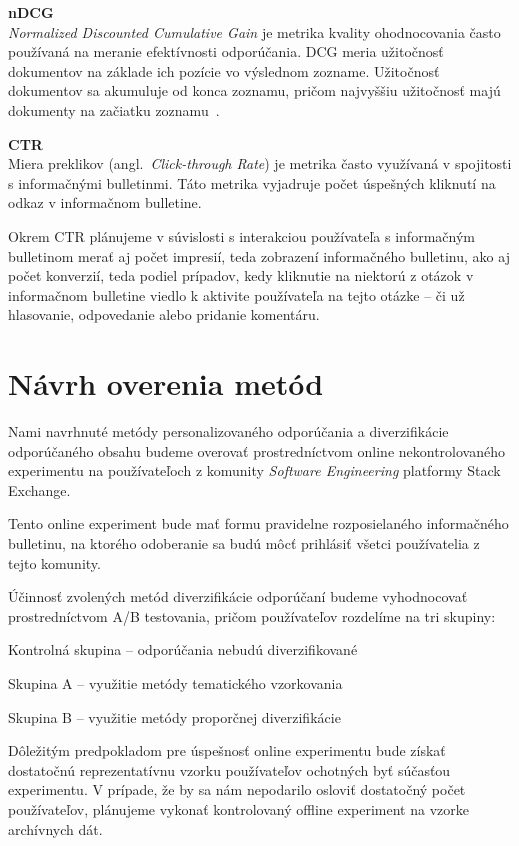 \textbf{nDCG}\\
\textit{Normalized Discounted Cumulative Gain} je metrika kvality ohodnocovania často používaná na meranie efektívnosti
odporúčania. DCG meria užitočnosť dokumentov na základe ich pozície vo výslednom zozname. Užitočnosť dokumentov sa akumuluje
od konca zoznamu, pričom najvyššiu užitočnosť majú dokumenty na začiatku zoznamu~\cite{Jrvelin2002}.

\textbf{CTR}\\
Miera preklikov (angl.~\emph{Click-through Rate}) je metrika často využívaná v spojitosti s informačnými bulletinmi.
Táto metrika vyjadruje počet úspešných kliknutí na odkaz v informačnom bulletine.

Okrem CTR plánujeme v súvislosti s interakciou používateľa s informačným bulletinom merať aj počet impresií,
teda zobrazení informačného bulletinu, ako aj počet konverzií, teda podiel prípadov, kedy kliknutie na niektorú z otázok
v informačnom bulletine viedlo k aktivite používateľa na tejto otázke -- či už hlasovanie, odpovedanie alebo pridanie komentáru.


\section{Návrh overenia metód}

Nami navrhnuté metódy personalizovaného odporúčania a diverzifikácie odporúčaného obsahu budeme overovať prostredníctvom
online nekontrolovaného experimentu na používateľoch z komunity \textit{Software Engineering} platformy Stack Exchange.

Tento online experiment bude mať formu pravidelne rozposielaného informačného bulletinu, na ktorého odoberanie sa budú
môcť prihlásiť všetci používatelia z tejto komunity.

Účinnosť zvolených metód diverzifikácie odporúčaní budeme vyhodnocovať prostredníctvom A/B testovania, pričom používateľov
rozdelíme na tri skupiny:
\begin{my_enumerate}
    \item{Kontrolná skupina -- odporúčania nebudú diverzifikované}
    \item{Skupina A -- využitie metódy tematického vzorkovania}
    \item{Skupina B -- využitie metódy proporčnej diverzifikácie}
\end{my_enumerate}

Dôležitým predpokladom pre úspešnosť online experimentu bude získať dostatočnú reprezentatívnu vzorku používateľov
ochotných byť súčasťou experimentu. V prípade, že by sa nám nepodarilo osloviť dostatočný počet používateľov, plánujeme
vykonať kontrolovaný offline experiment na vzorke archívnych dát.
